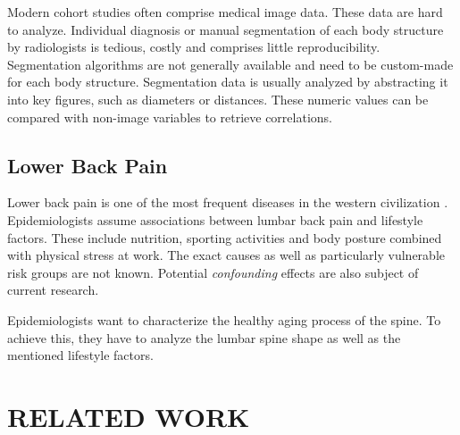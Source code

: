\documentclass[a4paper,twoside]{style/article}
\begin{document}
Modern cohort studies often comprise medical image data.
These data are hard to analyze.
Individual diagnosis or manual segmentation of each body structure by radiologists is tedious, costly and comprises little reproducibility.
Segmentation algorithms are not generally available and need to be custom-made for each body structure.
Segmentation data is usually analyzed by abstracting it into key figures, such as diameters or distances.
These numeric values can be compared with non-image variables to retrieve correlations.
\subsection{Lower Back Pain}
Lower back pain is one of the most frequent diseases in the western civilization \cite{Hoy2010}.
Epidemiologists assume associations between lumbar back pain and lifestyle factors.
These include nutrition, sporting activities and body posture combined with physical stress at work.
The exact causes as well as particularly vulnerable risk groups are not known.
Potential \emph{confounding} effects are also subject of current research.

Epidemiologists want to characterize the healthy aging process of the spine.
To achieve this, they have to analyze the lumbar spine shape as well as the mentioned lifestyle factors.
\section{\uppercase{Related Work}}
\label{sec:RelatedWork}
\end{document}
